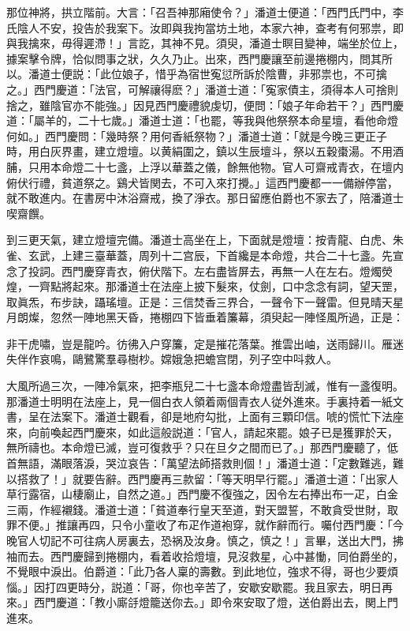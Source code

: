 那位神將，拱立階前。大言：「召吾神那廂使令？」潘道士便道：「西門氏門中，李氏陰人不安，投告於我案下。汝即與我拘當坊土地，本家六神，查考有何邪祟，即與我擒來，毋得遲滯！」言訖，其神不見。須臾，潘道士瞑目變神，端坐於位上，據案擊令牌，恰似問事之狀，久久乃止。出來，西門慶讓至前邊捲棚内，問其所以。潘道士便説：「此位娘子，惜乎為宿世寃愆所訴於陰曹，非邪祟也，不可擒之。」西門慶道：「法官，可解禳得麽？」潘道士道：「寃家債主，須得本人可捨則捨之，雖陰官亦不能強。」因見西門慶禮貌虔切，便問：「娘子年命若干？」西門慶道：「屬羊的，二十七歲。」潘道士道：「也罷，等我與他祭祭本命星壇，看他命燈何如。」西門慶問：「幾時祭？用何香紙祭物？」潘道士道：「就是今晚三更正子時，用白灰界畫，建立燈壇。以黄絹圍之，鎮以生辰壇斗，祭以五穀棗湯。不用酒脯，只用本命燈二十七盞，上浮以華蓋之儀，餘無他物。官人可齋戒青衣，在壇内俯伏行禮，貧道祭之。鷄犬皆関去，不可入來打攪。」這西門慶都一一備辦停當，就不敢進内。在書房中沐浴齋戒，換了淨衣。那日留應伯爵也不家去了，陪潘道士喫齋饌。

到三更天氣，建立燈壇完備。潘道士高坐在上，下面就是燈壇：按青龍、白虎、朱雀、玄武，上建三臺華蓋，周列十二宫辰，下首纔是本命燈，共合二十七盞。先宣念了投詞。西門慶穿青衣，俯伏階下。左右盡皆屏去，再無一人在左右。燈燭熒煌，一齊點將起來。那潘道士在法座上披下髮來，仗劍，口中念念有詞，望天罡，取眞炁，布步訣，躡瑤壇。正是：三信焚香三界合，一聲令下一聲雷。但見晴天星月朗燦，忽然一陣地黑天昏，捲棚四下皆垂着簾幕，須臾起一陣怪風所過，正是：

\begin{myquote}
非干虎嘯，豈是龍吟。彷彿入户穿簾，定是摧花落葉。推雲出岫，送雨歸川。雁迷失伴作哀鳴，鷗鷺驚羣尋樹杪。嫦娥急把蟾宫閉，列子空中呌救人。
\end{myquote}

大風所過三次，一陣冷氣來，把李瓶兒二十七盞本命燈盡皆刮滅，惟有一盞復明。那潘道士明明在法座上，見一個白衣人領着兩個青衣人従外進來。手裏持着一紙文書，呈在法案下。潘道士觀看，卻是地府勾批，上面有三顆印信。唬的慌忙下法座來，向前喚起西門慶來，如此這般説道：「官人，請起來罷。娘子已是獲罪於天，無所禱也。本命燈已滅，豈可復救乎？只在旦夕之間而已了。」那西門慶聽了，低首無語，滿眼落淚，哭泣哀告：「萬望法師搭救則個！」潘道士道：「定數難逃，難以搭救了！」就要告辭。西門慶再三款留：「等天明早行罷。」潘道士道：「出家人草行露宿，山棲廟止，自然之道。」西門慶不復強之，因令左右捧出布一疋，白金三兩，作經襯錢。潘道士道：「貧道奉行皇天至道，對天盟誓，不敢貪受世財，取罪不便。」推讓再四，只令小童收了布疋作道袍穿，就作辭而行。囑付西門慶：「今晚官人切記不可往病人房裏去，恐祸及汝身。慎之，慎之！」言畢，送出大門，拂袖而去。西門慶歸到捲棚内，看着收拾燈壇，見沒救星，心中甚慟，同伯爵坐的，不覺眼中淚出。伯爵道：「此乃各人稟的壽數。到此地位，強求不得，哥也少要煩惱。」因打四更時分，説道：「哥，你也辛苦了，安歇安歇罷。我且家去，明日再來。」西門慶道：「教小廝㧱燈籠送你去。」即令來安取了燈，送伯爵出去，関上門進來。

